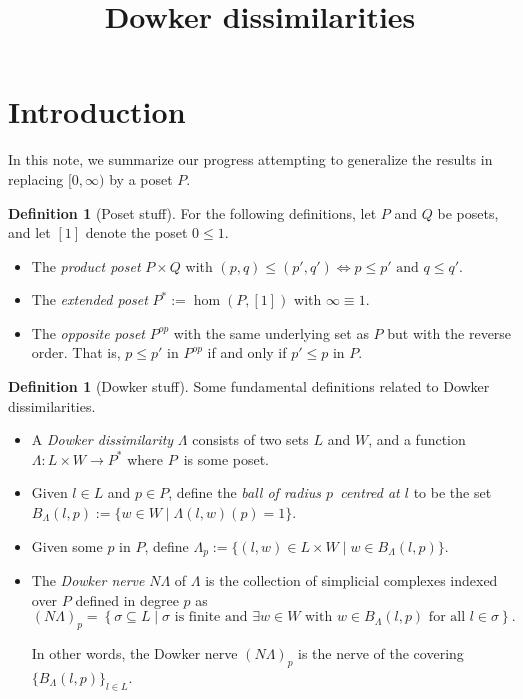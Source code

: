 \documentclass[10pt,a4paper]{article}
\title{Dowker dissimilarities}
\theoremstyle{definition}
\newtheorem{defn}[thm]{Definition}
\begin{document}
	\maketitle

\section{Introduction}

In this note, we summarize our progress attempting to generalize the results in \autocite{blaser2019sparse} replacing $[0,\infty)$ by a poset $P$.

\begin{defn}[Poset stuff]
	For the following definitions, let $P$ and $Q$ be posets, and let $[1]$ denote the poset $0\leq 1$.
	\begin{itemize}
		\item The \textit{product poset} $P\times Q$ with $(p,q)\leq(p',q')\iff p\leq p'\text{ and }q\leq q'$.
		
		\item The \textit{extended poset} $P^*:=\hom(P,[1])$ with $\infty \equiv 1$.
		
		\item The \textit{opposite poset} $P^{op}$ with the same underlying set as $P$ but with the reverse order. That is, $p\leq p'$ in $P^{op}$ if and only if $p'\leq p$ in $P$.
	\end{itemize}
\end{defn} 

\begin{defn}[Dowker stuff]
	Some fundamental definitions related to Dowker dissimilarities.
\begin{itemize}
\item A \textit{Dowker dissimilarity} $\Lambda$ consists of two sets $L$ and $W$, and a function $\Lambda\colon L\times W\to P^*$ where $P$ is some poset.

\item Given $l\in L$ and $p\in P$, define the \textit{ball of radius $p$ centred at $l$} to be the set $B_\Lambda(l,p):=\{w\in W\mid\Lambda(l,w)(p)=1\}$. 

\item Given some $p$ in $P$, define $\Lambda_p:=\{(l,w)\in L\times W\mid w\in B_\Lambda(l,p)\}$.

\item The \textit{Dowker nerve} $N\Lambda$ of $\Lambda$ is the collection of simplicial complexes indexed over $P$ defined in degree $p$ as 
$$
(N\Lambda)_{p} = \left\{\sigma\subseteq L\mid\sigma\text{ is finite and } \exists w\in W \text{ with } w\in B_\Lambda(l,p)\text{ for all }l\in\sigma \right\}.
$$

In other words, the Dowker nerve $(N\Lambda)_p$ is the nerve of the covering $\{B_\Lambda(l,p)\}_{l\in L}$.
\end{itemize}
\end{defn} 
\end{document}
